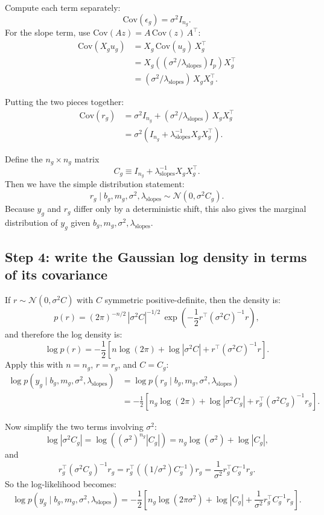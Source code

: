 \documentclass[11pt]{article}
\begin{document}
Compute each term separately:
\[
  \mathrm{Cov}(\epsilon_g) = \sigma^2 I_{n_g}.
\]
For the slope term, use $\mathrm{Cov}(A z) = A\,\mathrm{Cov}(z)\,A^\top$:
\begin{align*}
  \mathrm{Cov}(X_g u_g)
  &= X_g\,\mathrm{Cov}(u_g)\,X_g^\top \\
  &= X_g\left((\sigma^2/\lambda_{\mathrm{slopes}})I_p\right)X_g^\top \\
  &= (\sigma^2/\lambda_{\mathrm{slopes}})\,X_gX_g^\top.
\end{align*}

Putting the two pieces together:
\begin{align*}
  \mathrm{Cov}(r_g)
  &= \sigma^2 I_{n_g} + (\sigma^2/\lambda_{\mathrm{slopes}})\,X_gX_g^\top \\
  &= \sigma^2\left(I_{n_g} + \lambda_{\mathrm{slopes}}^{-1}X_gX_g^\top\right).
\end{align*}

Define the $n_g\times n_g$ matrix
\[
  C_g \equiv I_{n_g} + \lambda_{\mathrm{slopes}}^{-1}X_gX_g^\top.
\]
Then we have the simple distribution statement:
\[
  r_g \mid b_g,m_g,\sigma^2,\lambda_{\mathrm{slopes}} \sim \mathcal{N}(0,\sigma^2 C_g).
\]
Because $y_g$ and $r_g$ differ only by a deterministic shift, this also gives the marginal distribution of $y_g$ given
$b_g,m_g,\sigma^2,\lambda_{\mathrm{slopes}}$.

\subsection{Step 4: write the Gaussian log density in terms of its covariance}

If $r\sim\mathcal{N}(0,\sigma^2 C)$ with $C$ symmetric positive-definite, then the density is:
\[
  p(r) = (2\pi)^{-n/2}\,|\sigma^2 C|^{-1/2}\,\exp\!\left(-\frac{1}{2}r^\top(\sigma^2 C)^{-1}r\right),
\]
and therefore the log density is:
\[
  \log p(r) = -\frac{1}{2}\left[n\log(2\pi) + \log|\sigma^2 C| + r^\top(\sigma^2 C)^{-1}r\right].
\]
Apply this with $n=n_g$, $r=r_g$, and $C=C_g$:
\begin{align*}
  \log p(y_g \mid b_g,m_g,\sigma^2,\lambda_{\mathrm{slopes}})
  &= \log p(r_g \mid b_g,m_g,\sigma^2,\lambda_{\mathrm{slopes}}) \\
  &= -\frac{1}{2}\left[
    n_g\log(2\pi) + \log|\sigma^2 C_g| + r_g^\top(\sigma^2 C_g)^{-1}r_g
  \right].
\end{align*}

Now simplify the two terms involving $\sigma^2$:
\[
  \log|\sigma^2 C_g| = \log\!\left((\sigma^2)^{n_g}|C_g|\right) = n_g\log(\sigma^2) + \log|C_g|,
\]
and
\[
  r_g^\top(\sigma^2 C_g)^{-1}r_g = r_g^\top\left((1/\sigma^2)C_g^{-1}\right)r_g = \frac{1}{\sigma^2}r_g^\top C_g^{-1}r_g.
\]
So the log-likelihood becomes:
\[
  \log p(y_g \mid b_g,m_g,\sigma^2,\lambda_{\mathrm{slopes}})
  = -\frac{1}{2}\left[
    n_g\log(2\pi\sigma^2) + \log|C_g| + \frac{1}{\sigma^2}r_g^\top C_g^{-1}r_g
  \right].
\]
\end{document}
